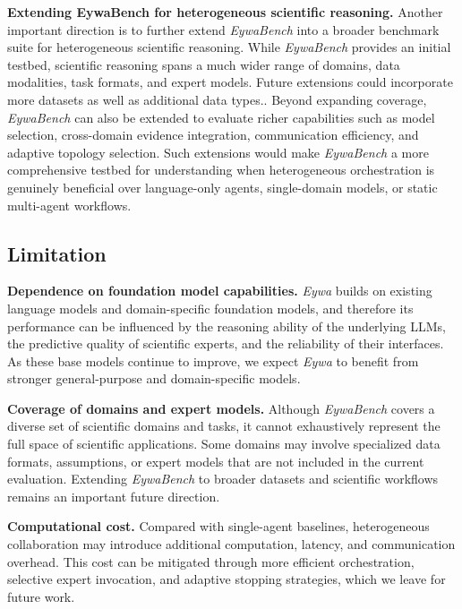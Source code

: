 \textbf{Extending EywaBench for heterogeneous scientific reasoning.}
Another important direction is to further extend \textit{EywaBench} into a broader benchmark suite for heterogeneous scientific reasoning. While \textit{EywaBench} provides an initial testbed, scientific reasoning spans a much wider range of domains, data modalities, task formats, and expert models. Future extensions could incorporate more datasets as well as additional data types.. Beyond expanding coverage, \textit{EywaBench} can also be extended to evaluate richer capabilities such as model selection, cross-domain evidence integration, communication efficiency, and adaptive topology selection. Such extensions would make \textit{EywaBench} a more comprehensive testbed for understanding when heterogeneous orchestration is genuinely beneficial over language-only agents, single-domain models, or static multi-agent workflows.


\subsection{Limitation}

\textbf{Dependence on foundation model capabilities.}
\textit{Eywa} builds on existing language models and domain-specific foundation models, and therefore its performance can be influenced by the reasoning ability of the underlying LLMs, the predictive quality of scientific experts, and the reliability of their interfaces. As these base models continue to improve, we expect \textit{Eywa} to benefit from stronger general-purpose and domain-specific models.

\textbf{Coverage of domains and expert models.}
Although \textit{EywaBench} covers a diverse set of scientific domains and tasks, it cannot exhaustively represent the full space of scientific applications. Some domains may involve specialized data formats, assumptions, or expert models that are not included in the current evaluation. Extending \textit{EywaBench} to broader datasets and scientific workflows remains an important future direction.

\textbf{Computational cost.}
Compared with single-agent baselines, heterogeneous collaboration may introduce additional computation, latency, and communication overhead. This cost can be mitigated through more efficient orchestration, selective expert invocation, and adaptive stopping strategies, which we leave for future work.